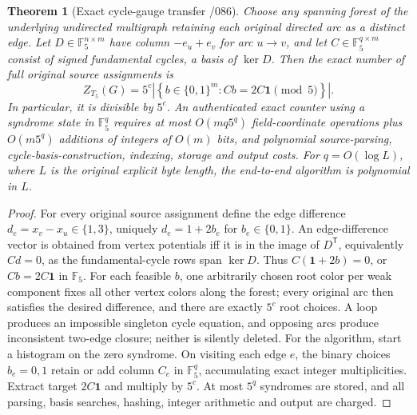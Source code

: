 \documentclass[11pt]{article}
\newtheorem{theorem}{Theorem}
\begin{document}
\begin{theorem}[Exact cycle-gauge transfer /086]
Choose any spanning forest of the underlying undirected multigraph
retaining each original directed arc as a distinct edge. Let
$D\in\mathbb F_5^{n\times m}$ have column $-e_u+e_v$ for arc $u\to v$,
and let $C\in\mathbb F_5^{q\times m}$ consist of signed fundamental
cycles, a basis of $\ker D$. Then the exact number of full original
source assignments is
\[
 Z_{T_5}(G)=5^c
 \left|\left\{b\in\{0,1\}^m:C b=2 C\mathbf 1
 \pmod 5\right\}\right|.
\]
In particular, it is divisible by $5^c$. An authenticated exact counter
using a syndrome state in $\mathbb F_5^q$ requires at most
$O(mq5^q)$ field-coordinate operations plus
$O(m5^q)$ additions of integers of $O(m)$ bits, and polynomial
source-parsing, cycle-basis-construction, indexing, storage and output
costs. For $q=O(\log L)$, where $L$ is the original explicit byte
length, the end-to-end algorithm is polynomial in $L$.
\end{theorem}
\begin{proof}
For every original source assignment define the edge difference
$d_e=x_v-x_u\in\{1,3\}$, uniquely $d_e=1+2b_e$ for
$b_e\in\{0,1\}$. An edge-difference vector is obtained from vertex
potentials iff it is in the image of $D^{\mathsf T}$, equivalently
$Cd=0$, as the fundamental-cycle rows span $\ker D$.
Thus $C(\mathbf1+2b)=0$, or $Cb=2C\mathbf1$ in $\mathbb F_5$.
For each feasible $b$, one arbitrarily chosen root color per weak
component fixes all other vertex colors along the forest; every
original arc then satisfies the desired difference, and there are
exactly $5^c$ root choices. A loop produces an impossible singleton
cycle equation, and opposing arcs produce inconsistent two-edge
closure; neither is silently deleted.
For the algorithm, start a histogram on the zero syndrome. On visiting
each edge $e$, the binary choices $b_e=0,1$ retain or add column $C_e$
in $\mathbb F_5^q$, accumulating exact integer multiplicities.
Extract target $2C\mathbf1$ and multiply by $5^c$.
At most $5^q$ syndromes are stored, and all parsing, basis searches,
hashing, integer arithmetic and output are charged.
\end{proof}
\end{document}
